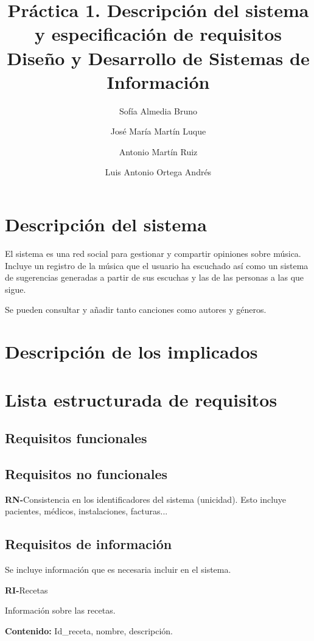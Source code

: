 \documentclass[11pt,a4paper]{article}
\title{Práctica 1. Descripción del sistema y especificación de requisitos \large Diseño y Desarrollo de Sistemas de Información}
\author{Sofía Almedia Bruno \and José María Martín Luque \and Antonio Martín Ruiz \and Luis Antonio Ortega Andrés}
\newcounter{RNCounter}
\newcommand{\rn}[1]{\addtocounter{RNCounter}{1}\textbf{\rmfamily RN-\theRNCounter}\quad#1\\}
\newcounter{RICounter}
\newenvironment{rienv}[1]
	{\addtocounter{RICounter}{1}\textbf{\rmfamily RI-\theRICounter}\quad#1\begin{adjustwidth}{1em}{0em}}
	{\end{adjustwidth}}
\begin{document}
\maketitle

\section{Descripción del sistema} %
\label{sec:descripcion_del_sistema}
El sistema es una red social para gestionar y compartir opiniones sobre música. Incluye un registro de la música que el usuario ha escuchado así como un sistema de sugerencias generadas a partir de sus escuchas y las de las personas a las que sigue.

Se pueden consultar y añadir tanto canciones como autores y géneros. 





\section{Descripción de los implicados} %
\label{sec:descripción_de_los_implicados}

\section{Lista estructurada de requisitos} %
\label{sec:lista_estructurada_de_requisitos}

\subsection{Requisitos funcionales}



\subsection{Requisitos no funcionales}
  \rn{Consistencia en los identificadores del sistema (unicidad). Esto incluye pacientes, médicos, instalaciones, facturas...}


\subsection{Requisitos de información}

Se incluye información que es necesaria incluir en el sistema.


\begin{rienv}{Recetas}
	Información sobre las recetas.

  	\textbf{Contenido:} Id\_receta, nombre, descripción.
\end{rienv}
  

	
\end{document}
